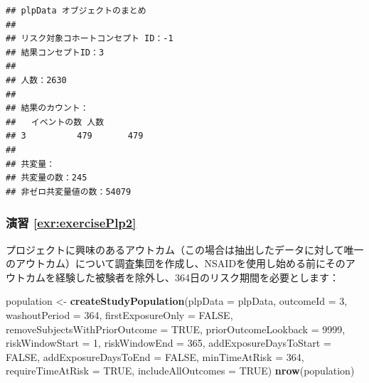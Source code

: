 \documentclass[
  11pt]{book}
\newenvironment{Shaded}{\begin{snugshade}}{\end{snugshade}}
\newcommand{\AttributeTok}[1]{\textcolor[rgb]{0.13,0.29,0.53}{#1}}
\newcommand{\ConstantTok}[1]{\textcolor[rgb]{0.56,0.35,0.01}{#1}}
\newcommand{\DecValTok}[1]{\textcolor[rgb]{0.00,0.00,0.81}{#1}}
\newcommand{\FunctionTok}[1]{\textcolor[rgb]{0.13,0.29,0.53}{\textbf{#1}}}
\newcommand{\NormalTok}[1]{#1}
\newcommand{\OtherTok}[1]{\textcolor[rgb]{0.56,0.35,0.01}{#1}}
\theoremstyle{definition}
\theoremstyle{definition}
\theoremstyle{definition}
\theoremstyle{definition}
\theoremstyle{remark}
\begin{document}
\begin{verbatim}
## plpData オブジェクトのまとめ
## 
## リスク対象コホートコンセプト ID：-1
## 結果コンセプトID：3
## 
## 人数：2630
## 
## 結果のカウント：
##   イベントの数 人数
## 3          479       479
## 
## 共変量：
## 共変量の数：245
## 非ゼロ共変量値の数：54079
\end{verbatim}

\subsubsection*{演習 \ref{exr:exercisePlp2}}\label{ux6f14ux7fd2-refexrexerciseplp2}

プロジェクトに興味のあるアウトカム（この場合は抽出したデータに対して唯一のアウトカム）について調査集団を作成し、NSAIDを使用し始める前にそのアウトカムを経験した被験者を除外し、364日のリスク期間を必要とします：

\begin{Shaded}
\begin{Highlighting}[]
\NormalTok{population }\OtherTok{\textless{}{-}} \FunctionTok{createStudyPopulation}\NormalTok{(}\AttributeTok{plpData =}\NormalTok{ plpData,}
                                    \AttributeTok{outcomeId =} \DecValTok{3}\NormalTok{,}
                                    \AttributeTok{washoutPeriod =} \DecValTok{364}\NormalTok{,}
                                    \AttributeTok{firstExposureOnly =} \ConstantTok{FALSE}\NormalTok{,}
                                    \AttributeTok{removeSubjectsWithPriorOutcome =} \ConstantTok{TRUE}\NormalTok{,}
                                    \AttributeTok{priorOutcomeLookback =} \DecValTok{9999}\NormalTok{,}
                                    \AttributeTok{riskWindowStart =} \DecValTok{1}\NormalTok{,}
                                    \AttributeTok{riskWindowEnd =} \DecValTok{365}\NormalTok{,}
                                    \AttributeTok{addExposureDaysToStart =} \ConstantTok{FALSE}\NormalTok{,}
                                    \AttributeTok{addExposureDaysToEnd =} \ConstantTok{FALSE}\NormalTok{,}
                                    \AttributeTok{minTimeAtRisk =} \DecValTok{364}\NormalTok{,}
                                    \AttributeTok{requireTimeAtRisk =} \ConstantTok{TRUE}\NormalTok{,}
                                    \AttributeTok{includeAllOutcomes =} \ConstantTok{TRUE}\NormalTok{)}
\FunctionTok{nrow}\NormalTok{(population)}
\end{Highlighting}
\end{Shaded}
\end{document}
